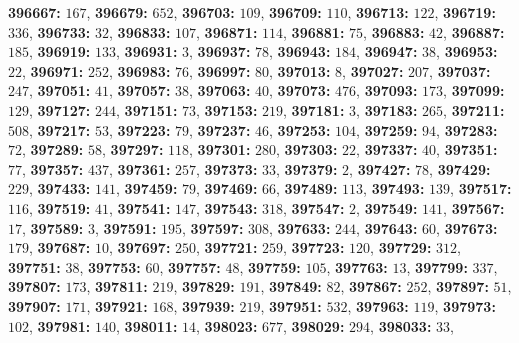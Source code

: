\textsf{\bfseries 396667:} $167$, \textsf{\bfseries 396679:} $652$, \textsf{\bfseries 396703:} $109$, \textsf{\bfseries 396709:} $110$, \textsf{\bfseries 396713:} $122$, \textsf{\bfseries 396719:} $336$, \textsf{\bfseries 396733:} $32$, \textsf{\bfseries 396833:} $107$, \textsf{\bfseries 396871:} $114$, \textsf{\bfseries 396881:} $75$, \textsf{\bfseries 396883:} $42$, \textsf{\bfseries 396887:} $185$, \textsf{\bfseries 396919:} $133$, \textsf{\bfseries 396931:} $3$, \textsf{\bfseries 396937:} $78$, \textsf{\bfseries 396943:} $184$, \textsf{\bfseries 396947:} $38$, \textsf{\bfseries 396953:} $22$, \textsf{\bfseries 396971:} $252$, \textsf{\bfseries 396983:} $76$, \textsf{\bfseries 396997:} $80$, \textsf{\bfseries 397013:} $8$, \textsf{\bfseries 397027:} $207$, \textsf{\bfseries 397037:} $247$, \textsf{\bfseries 397051:} $41$, \textsf{\bfseries 397057:} $38$, \textsf{\bfseries 397063:} $40$, \textsf{\bfseries 397073:} $476$, \textsf{\bfseries 397093:} $173$, \textsf{\bfseries 397099:} $129$, \textsf{\bfseries 397127:} $244$, \textsf{\bfseries 397151:} $73$, \textsf{\bfseries 397153:} $219$, \textsf{\bfseries 397181:} $3$, \textsf{\bfseries 397183:} $265$, \textsf{\bfseries 397211:} $508$, \textsf{\bfseries 397217:} $53$, \textsf{\bfseries 397223:} $79$, \textsf{\bfseries 397237:} $46$, \textsf{\bfseries 397253:} $104$, \textsf{\bfseries 397259:} $94$, \textsf{\bfseries 397283:} $72$, \textsf{\bfseries 397289:} $58$, \textsf{\bfseries 397297:} $118$, \textsf{\bfseries 397301:} $280$, \textsf{\bfseries 397303:} $22$, \textsf{\bfseries 397337:} $40$, \textsf{\bfseries 397351:} $77$, \textsf{\bfseries 397357:} $437$, \textsf{\bfseries 397361:} $257$, \textsf{\bfseries 397373:} $33$, \textsf{\bfseries 397379:} $2$, \textsf{\bfseries 397427:} $78$, \textsf{\bfseries 397429:} $229$, \textsf{\bfseries 397433:} $141$, \textsf{\bfseries 397459:} $79$, \textsf{\bfseries 397469:} $66$, \textsf{\bfseries 397489:} $113$, \textsf{\bfseries 397493:} $139$, \textsf{\bfseries 397517:} $116$, \textsf{\bfseries 397519:} $41$, \textsf{\bfseries 397541:} $147$, \textsf{\bfseries 397543:} $318$, \textsf{\bfseries 397547:} $2$, \textsf{\bfseries 397549:} $141$, \textsf{\bfseries 397567:} $17$, \textsf{\bfseries 397589:} $3$, \textsf{\bfseries 397591:} $195$, \textsf{\bfseries 397597:} $308$, \textsf{\bfseries 397633:} $244$, \textsf{\bfseries 397643:} $60$, \textsf{\bfseries 397673:} $179$, \textsf{\bfseries 397687:} $10$, \textsf{\bfseries 397697:} $250$, \textsf{\bfseries 397721:} $259$, \textsf{\bfseries 397723:} $120$, \textsf{\bfseries 397729:} $312$, \textsf{\bfseries 397751:} $38$, \textsf{\bfseries 397753:} $60$, \textsf{\bfseries 397757:} $48$, \textsf{\bfseries 397759:} $105$, \textsf{\bfseries 397763:} $13$, \textsf{\bfseries 397799:} $337$, \textsf{\bfseries 397807:} $173$, \textsf{\bfseries 397811:} $219$, \textsf{\bfseries 397829:} $191$, \textsf{\bfseries 397849:} $82$, \textsf{\bfseries 397867:} $252$, \textsf{\bfseries 397897:} $51$, \textsf{\bfseries 397907:} $171$, \textsf{\bfseries 397921:} $168$, \textsf{\bfseries 397939:} $219$, \textsf{\bfseries 397951:} $532$, \textsf{\bfseries 397963:} $119$, \textsf{\bfseries 397973:} $102$, \textsf{\bfseries 397981:} $140$, \textsf{\bfseries 398011:} $14$, \textsf{\bfseries 398023:} $677$, \textsf{\bfseries 398029:} $294$, \textsf{\bfseries 398033:} $33$, 
